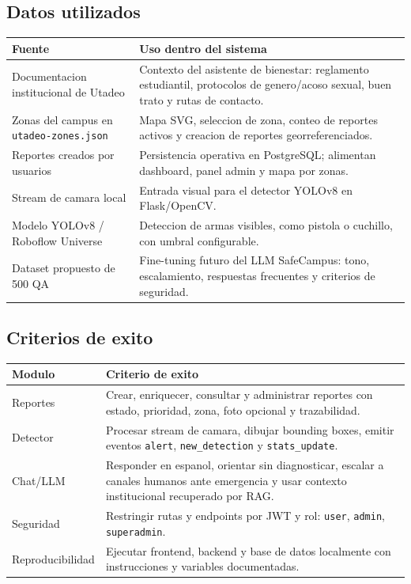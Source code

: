 \documentclass[11pt,letterpaper]{article}
\begin{document}
\subsection{Datos utilizados}

\begin{tabularx}{\textwidth}{P{4cm}Y}
    \toprule
    \textbf{Fuente} & \textbf{Uso dentro del sistema} \\
    \midrule
    Documentacion institucional de Utadeo & Contexto del asistente de bienestar: reglamento estudiantil, protocolos de genero/acoso sexual, buen trato y rutas de contacto. \\
    \midrule
    Zonas del campus en \texttt{utadeo-zones.json} & Mapa SVG, seleccion de zona, conteo de reportes activos y creacion de reportes georreferenciados. \\
    \midrule
    Reportes creados por usuarios & Persistencia operativa en PostgreSQL; alimentan dashboard, panel admin y mapa por zonas. \\
    \midrule
    Stream de camara local & Entrada visual para el detector YOLOv8 en Flask/OpenCV. \\
    \midrule
    Modelo YOLOv8 / Roboflow Universe & Deteccion de armas visibles, como pistola o cuchillo, con umbral configurable. \\
    \midrule
    Dataset propuesto de 500 QA & Fine-tuning futuro del LLM SafeCampus: tono, escalamiento, respuestas frecuentes y criterios de seguridad. \\
    \bottomrule
\end{tabularx}

\subsection{Criterios de exito}

\begin{tabularx}{\textwidth}{P{4.2cm}Y}
    \toprule
    \textbf{Modulo} & \textbf{Criterio de exito} \\
    \midrule
    Reportes & Crear, enriquecer, consultar y administrar reportes con estado, prioridad, zona, foto opcional y trazabilidad. \\
    Detector & Procesar stream de camara, dibujar bounding boxes, emitir eventos \texttt{alert}, \texttt{new\_detection} y \texttt{stats\_update}. \\
    Chat/LLM & Responder en espanol, orientar sin diagnosticar, escalar a canales humanos ante emergencia y usar contexto institucional recuperado por RAG. \\
    Seguridad & Restringir rutas y endpoints por JWT y rol: \texttt{user}, \texttt{admin}, \texttt{superadmin}. \\
    Reproducibilidad & Ejecutar frontend, backend y base de datos localmente con instrucciones y variables documentadas. \\
    \bottomrule
\end{tabularx}
\end{document}
